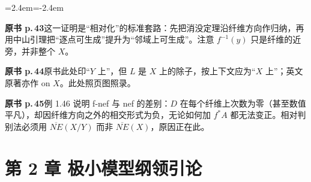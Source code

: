\begin{list}{}{\leftmargin=2.4em\itemindent=-2.4em\itemsep=2pt\parsep=0pt}
\item \textbf{原书 p.\,43}\quad 这一证明是“相对化”的标准套路：先把消没定理沿纤维方向作归纳，再用中山引理把“逐点可生成”提升为“邻域上可生成”。注意 $f^{-1}(y)$ 只是纤维的近旁，并非整个 $X$。
\item \textbf{原书 p.\,44}\quad 原书此处印“$Y$ 上”，但 $L$ 是 $X$ 上的除子，按上下文应为“$X$ 上”；英文原著亦作 on $X$。此处照页图照录。
\item \textbf{原书 p.\,45}\quad 例 1.46 说明 f-nef 与 nef 的差别：$D$ 在每个纤维上次数为零（甚至数值平凡），却因纤维方向之外的相交形式为负，无论如何加 $f^*A$ 都无法变正。相对判别法必须用 $\overline{NE}(X/Y)$ 而非 $\overline{NE}(X)$，原因正在此。
\end{list}

\section*{第 2 章 极小模型纲领引论}

